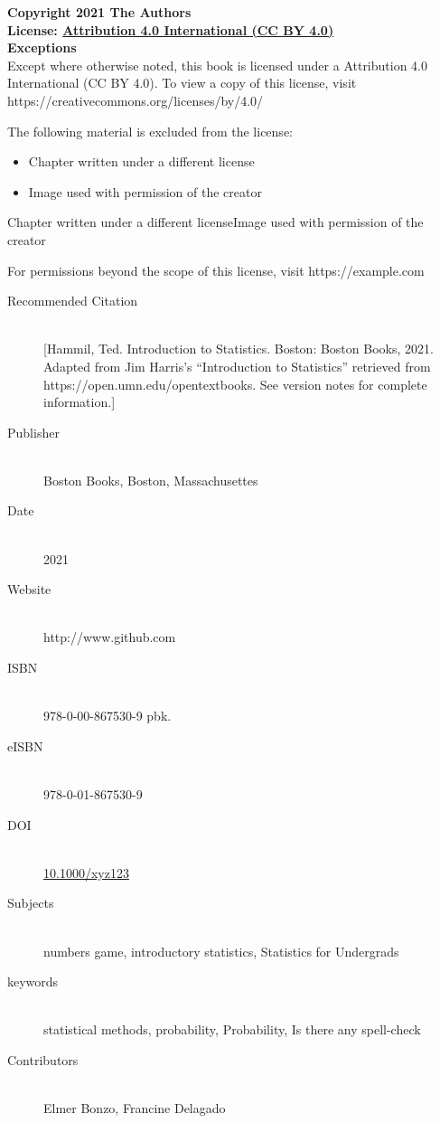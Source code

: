 \documentclass{book}
\newcommand{\booklicense}{\href{https://creativecommons.org/licenses/by/4.0/}{Attribution
4.0 International (CC BY 4.0)}}
\begin{document}
\begin{flushleft}

\textbf{Copyright \textcopyright{} 2021  The Authors\\
License: \booklicense}\\[11pt] 

\textbf{Exceptions} \\

Except where otherwise noted, this book is licensed under a Attribution 4.0
International (CC BY
4.0). To view a copy of this license, visit https://creativecommons.org/licenses/by/4.0/

The following material is excluded from the license: 

\begin{itemize}
    \item Chapter written under a different license
    \item Image used with permission of the creator
  \end{itemize}

Chapter written under a different licenseImage used with permission of the
creator

For permissions beyond the scope of this license, visit https://example.com

\vspace*{\fill}

\begin{description}
  \item[Recommended Citation] \hfill \\ {[}Hammil, Ted. Introduction to
Statistics. Boston: Boston Books, 2021. Adapted from Jim Harris's
``Introduction to Statistics'' retrieved from
https://open.umn.edu/opentextbooks. See version notes for complete
information.{]}
  \item[Publisher] \hfill \\ Boston Books, Boston, Massachusettes
  \item[Date] \hfill \\ 2021
    \item[Website] \hfill \\ http://www.github.com
      \item[ISBN] \hfill \\ 978-0-00-867530-9 pbk.
      \item[eISBN] \hfill \\ 978-0-01-867530-9
      \item[DOI] \hfill \\ \href{https://doi.org/10.1000/xyz123}{10.1000/xyz123}
    \item[Subjects] \hfill \\ numbers game, introductory
statistics, Statistics for Undergrads
  \item[keywords] \hfill \\ statistical methods, probability, Probability, Is
there any spell-check
    \item[Contributors] \hfill \\ Elmer Bonzo, Francine Delagado
  

\end{description}
\end{flushleft}
\end{document}
